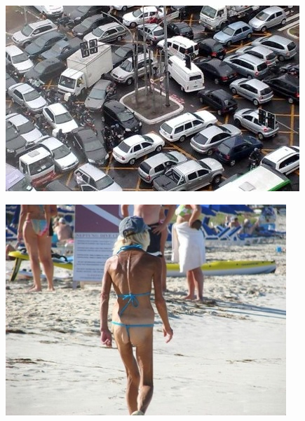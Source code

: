 \begin{center}
\includegraphics[scale=1]{d.jpg}
\end{center}
\begin{center}
\includegraphics[scale=1]{a.jpg}
\end{center}

